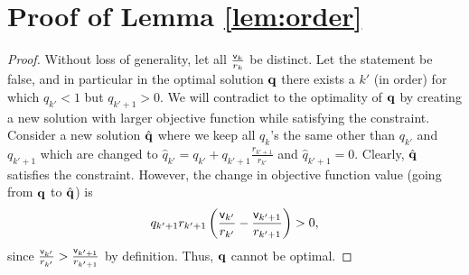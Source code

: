 \section{Proof of Lemma \ref{lem:order}}
\begin{proof}
Without loss of generality, let all $\frac{ {\mathsf{v}}_k}{r_k}$ be distinct.
  Let the statement be false, and in particular in the optimal solution ${\mathbf{q}}$ there exists a $k'$ (in order) for which $q_{k'} < 1$  but $q_{k'+1} > 0$. We will contradict to the optimality of ${\mathbf{q}}$ by creating a new solution with larger objective function while satisfying the constraint. Consider a new solution ${\hat {{\mathbf{q}}}}$ where we keep all 
  $q_k$'s the same other than $q_{k'}$ and $q_{k'+1}$ which are changed to ${\hat q}_{k'} = q_{k'}+q_{k'+1} \frac{r_{k'+1}}{r_{k'}}$ and ${\hat q}_{k'+1}=0$. Clearly, ${\hat {{\mathbf{q}}}}$ satisfies the constraint. However, the change in objective function value (going from ${\mathbf{q}}$ to $\hat {{\mathbf{q}}}$) is 
  $$q_{k'+1}r_{k'+1} \left( \frac{{\mathsf{v}}_{k'}}{r_{k'}} - \frac{{\mathsf{v}}_{k'+1}}{r_{k'+1}}\right) >0,$$ since $\frac{{\mathsf{v}}_{k'}}{r_{k'}} > \frac{{\mathsf{v}}_{k'+1}}{r_{k'+1}}$ by definition.
  Thus, ${\mathbf{q}}$ cannot be optimal.
\end{proof}

